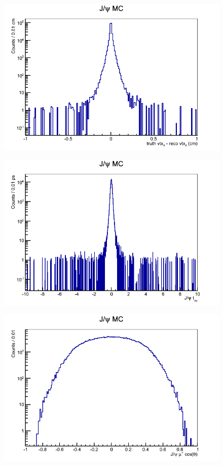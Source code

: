 \documentclass[a4paper,12pt]{article}
\begin{document}
\begin{figure}[]
    \centering
      \includegraphics[scale=0.5]{Images/jpsi_truth_vtx_z_minus_jpsi_reco_vtx_z.png}
    \caption{}
\end{figure}
\begin{figure}[]
    \centering
      \includegraphics[scale=0.5]{Images/jpsi_tau_xy_very_fine_al.png}
    \caption{}
\end{figure}
\begin{figure}[]
    \centering
      \includegraphics[scale=0.5]{Images/jpsi_cos_mu_plus.png}
    \caption{}
\end{figure}
\end{document}
